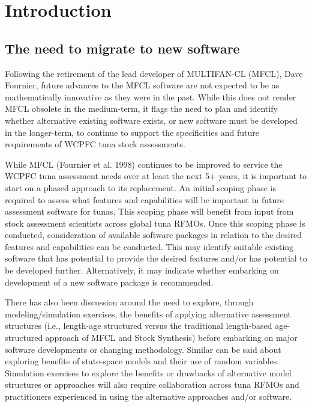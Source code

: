 \documentclass{SCreport}
\begin{document}
\section{Introduction}

\subsection{The need to migrate to new software}

Following the retirement of the lead developer of MULTIFAN-CL (MFCL), Dave
Fournier, future advances to the MFCL software are not expected to be as
mathematically innovative as they were in the past. While this does not render
MFCL obsolete in the medium-term, it flags the need to plan and identify whether
alternative existing software exists, or new software must be developed in the
longer-term, to continue to support the specificities and future requirements of
WCPFC tuna stock assessments.

While MFCL (Fournier et al. 1998) continues to be improved to service the WCPFC
tuna assessment needs over at least the next 5+ years, it is important to start
on a phased approach to its replacement. An initial scoping phase is required to
assess what features and capabilities will be important in future assessment
software for tunas. This scoping phase will benefit from input from stock
assessment scientists across global tuna RFMOs. Once this scoping phase is
conducted, consideration of available software packages in relation to the
desired features and capabilities can be conducted. This may identify suitable
existing software that has potential to provide the desired features and/or has
potential to be developed further. Alternatively, it may indicate whether
embarking on development of a new software package is recommended.

There has also been discussion around the need to explore, through
modeling/simulation exercises, the benefits of applying alternative assessment
structures (i.e., length-age structured versus the traditional length-based
age-structured approach of MFCL and Stock Synthesis) before embarking on major
software developments or changing methodology. Similar can be said about
exploring benefits of state-space models and their use of random variables.
Simulation exercises to explore the benefits or drawbacks of alternative model
structures or approaches will also require collaboration across tuna RFMOs and
practitioners experienced in using the alternative approaches and/or software.
\end{document}
